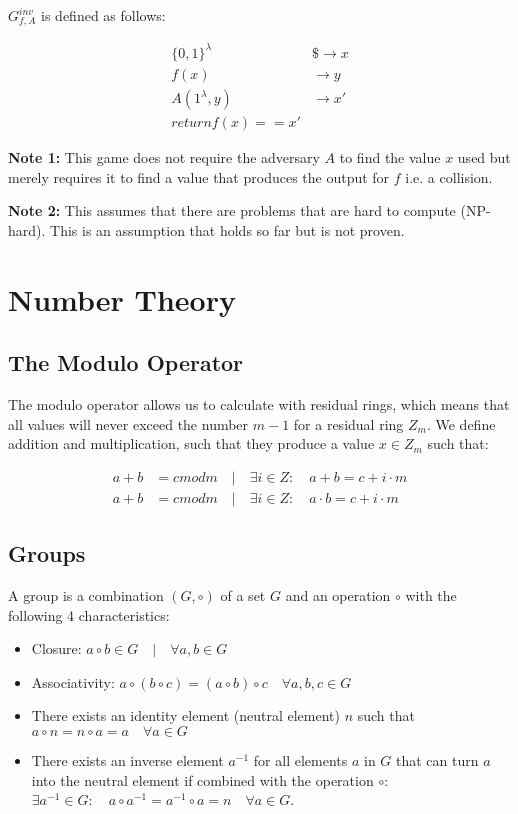 $G^{inv}_{f,A}$ is defined as follows:

\begin{align*}
    \{0,1\}^\lambda & \$\rightarrow x \\
    f (x)           & \rightarrow y   \\
    A(1^\lambda, y) & \rightarrow x'  \\
    return f(x) == x'
\end{align*}

\textbf{Note 1:} This game does not require the adversary $A$ to find the value $x$ used but merely requires it to find a value that produces the output for $f$ i.e. a collision.

\textbf{Note 2:} This assumes that there are problems that are hard to compute (NP-hard). This is an assumption that holds so far but is not proven.

\section{Number Theory}\label{sec:number_theory}

\subsection{The Modulo Operator}

The modulo operator allows us to calculate with residual rings, which means that all values will never exceed the number $m-1$ for a residual ring $Z_m$.
We define addition and multiplication, such that they produce a value $x \in Z_m$ such that:

\begin{align*}
    a + b & = c mod m \quad |\quad \exists i \in Z: \quad a + b = c + i \cdot m     \\
    a + b & = c mod m \quad |\quad \exists i \in Z: \quad a \cdot b = c + i \cdot m
\end{align*}

\subsection{Groups}

A group is a combination $(G,\circ)$ of a set $G$ and an operation $\circ$ with the following 4 characteristics:

\begin{itemize}
    \item Closure: $a \circ b \in G \quad | \quad \forall a,b \in G$
    \item Associativity: $a \circ (b \circ c) = (a \circ b) \circ c \quad \forall a,b,c \in G$
    \item There exists an identity element (neutral element) $n$ such that $a \circ n = n \circ a = a \quad \forall a \in G$
    \item There exists an inverse element $a^{-1}$ for all elements $a$ in $G$ that can turn $a$ into the neutral element if combined with the operation $\circ$: $\exists a^{-1} \in G: \quad a \circ a^{-1} = a^{-1} \circ a = n \quad \forall a \in G$.
\end{itemize}

